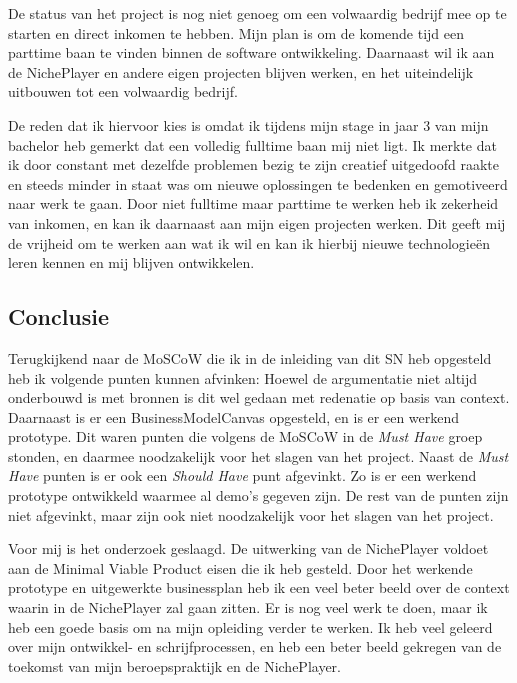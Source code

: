 De status van het project is nog niet genoeg om een volwaardig bedrijf mee op te starten en direct inkomen te hebben. Mijn plan is om de komende tijd een parttime baan te vinden binnen de software ontwikkeling. Daarnaast wil ik aan de NichePlayer en andere eigen projecten blijven werken, en het uiteindelijk uitbouwen tot een volwaardig bedrijf.

De reden dat ik hiervoor kies is omdat ik tijdens mijn stage in jaar 3 van mijn bachelor heb gemerkt dat een volledig fulltime baan mij niet ligt. Ik merkte dat ik door constant met dezelfde problemen bezig te zijn creatief uitgedoofd raakte en steeds minder in staat was om nieuwe oplossingen te bedenken en gemotiveerd naar werk te gaan. Door niet fulltime maar parttime te werken heb ik zekerheid van inkomen, en kan ik daarnaast aan mijn eigen projecten werken. Dit geeft mij de vrijheid om te werken aan wat ik wil en kan ik hierbij nieuwe technologieën leren kennen en mij blijven ontwikkelen.

\subsection{Conclusie}
Terugkijkend naar de MoSCoW die ik in de inleiding van dit SN heb opgesteld heb ik volgende punten kunnen afvinken: Hoewel de argumentatie niet altijd onderbouwd is met bronnen is dit wel gedaan met redenatie op basis van context. Daarnaast is er een BusinessModelCanvas opgesteld, en is er een werkend prototype. Dit waren punten die volgens de MoSCoW in de \textit{Must Have} groep stonden, en daarmee noodzakelijk voor het slagen van het project. Naast de \textit{Must Have} punten is er ook een \textit{Should Have} punt afgevinkt. Zo is er een werkend prototype ontwikkeld waarmee al demo's gegeven zijn. De rest van de punten zijn niet afgevinkt, maar zijn ook niet noodzakelijk voor het slagen van het project.

Voor mij is het onderzoek geslaagd. De uitwerking van de NichePlayer voldoet aan de Minimal Viable Product eisen die ik heb gesteld. Door het werkende prototype en uitgewerkte businessplan heb ik een veel beter beeld over de context waarin in de NichePlayer zal gaan zitten. Er is nog veel werk te doen, maar ik heb een goede basis om na mijn opleiding verder te werken. Ik heb veel geleerd over mijn ontwikkel- en schrijfprocessen, en heb een beter beeld gekregen van de toekomst van mijn beroepspraktijk en de NichePlayer.
